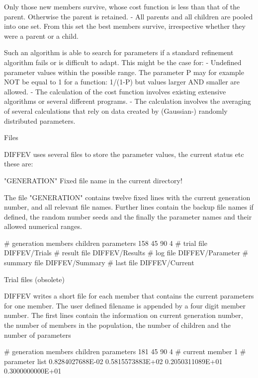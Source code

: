   Only those new members survive, whose cost function is 
  less than that of the parent. Otherwise the parent is retained. 
- All parents and all children are pooled into one set. From this set 
  the best members survive, irrespective whether they were a parent 
  or a child. 
\par
Such an algorithm is able to search for parameters if a standard refinement 
algorithm fails or is difficult to adapt. This might be the case for: 
- Undefined parameter values within the possible range. The parameter 
  P may for example NOT be equal to 1 for a function: 1/(1-P) but values 
  larger AND smaller are allowed. 
- The calculation of the cost function involves existing extensive 
  algorithms or several different programs. 
- The calculation involves the averaging of several calculations that 
  rely on data created by (Gaussian-) randomly distributed parameters. 
\par
Files 
\par
DIFFEV uses several files to store the parameter values, the current 
status etc these are: 
\par
"GENERATION"   Fixed file name in the current directory! 
\par
The file "GENERATION" contains twelve fixed lines with the current 
generation number, and all relevant file names. 
Further lines contain the backup file names if defined, the random 
number seeds and the finally the parameter names and their allowed 
numerical ranges. 
\par
\begin{MacVerbatim}
 # generation members children parameters
      158        45        90         4
 # trial file
 DIFFEV/Trials
 # result file
 DIFFEV/Results
 # log file
 DIFFEV/Parameter
 # summary file
 DIFFEV/Summary
 # last    file
 DIFFEV/Current
\end{MacVerbatim}
Trial files (obsolete) 
\par
DIFFEV writes a short file for each member that contains the current 
parameters for one member. 
The user defined filename is appended by a four digit member number. 
The first lines contain the information 
on current generation number, the number of members in the population, 
the number of children and the number of parameters 
\begin{MacVerbatim}
# generation members children parameters
     181        45        90         4
# current member
    1
# parameter list
    0.8284027688E-02
    0.5815573883E+02
    0.2050311089E+01
    0.3000000000E+01
\end{MacVerbatim}

